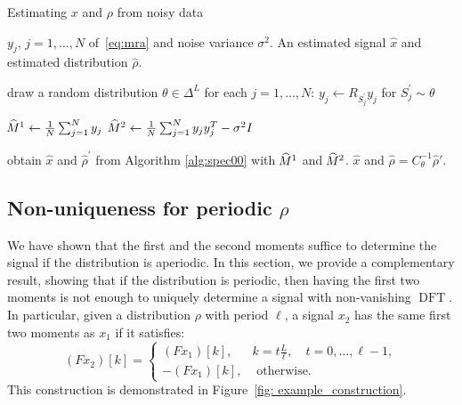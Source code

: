\documentclass{IEEEtran}
\numberwithin{equation}{section}
\numberwithin{figure}{section}
\theoremstyle{plain}
\theoremstyle{definition}
\theoremstyle{remark}
\theoremstyle{plain}
\theoremstyle{remark}
\theoremstyle{plain}
\theoremstyle{plain}
\theoremstyle{remark}
\newcommand{\F}{F}
\newcommand{\DFT}{\operatorname{DFT}}
\newcommand{\hatM}{\widehat{\hspace{-1pt}M}\phantom{\hspace{-11pt}M}}
\begin{document}
\begin{algorithm}[ht]
    \caption{Estimating $x$ and $\rho$ from noisy data}
    \label{alg:SpectralAlg}
    \begin{algorithmic}[1]
        \REQUIRE  $y_j$, $j=1,\ldots,N$ of~\eqref{eq:mra} and noise variance $\sigma^2$.
        \ENSURE An estimated signal $\hat{x}$ and estimated distribution $\hat{\rho}$.
        
         \setcounter{ALC@line}{0}  \renewcommand{\theALC@line}{1.\arabic{ALC@line}}
        \STATE draw a random distribution $\theta \in \Delta^L $
        \STATE for each $j=1,\dots,N$: $y_j \gets R_{S^\prime_j}y_j $ for $S^\prime_j \sim\theta$

        
         \setcounter{ALC@line}{0}  \renewcommand{\theALC@line}{2.\arabic{ALC@line}}
        \STATE $\hatM^1 \gets \frac{1}{N} \sum_{j=1}^N y_j$
        \STATE $\hatM^2 \gets \frac{1}{N} \sum_{j=1}^N y_j y_j^T -\sigma^2 I $ \label{line:ps1}
                
         \setcounter{ALC@line}{0}  \renewcommand{\theALC@line}{3.\arabic{ALC@line}}
        
        \STATE obtain $\hat{x}$ and $\hat{\rho}^\prime$ from Algorithm \ref{alg:spec00} with $\hatM^1$ and $\hatM^2$.
        \RETURN $\hat{x}$ and $\hat{\rho} = C_\theta^{-1}\hat{\rho}'.$
    \end{algorithmic}
\end{algorithm}

\subsection{Non-uniqueness for periodic $\rho$}
\label{sec:nonunique}

We have shown that the first and the second moments suffice to determine the signal if the distribution is aperiodic. In this section, we provide a complementary result, showing that if the distribution is periodic, then having the first two moments is not enough to uniquely determine a signal with non-vanishing $\DFT$. In particular, given a distribution $\rho$ with period $\ell$, a signal $x_2$ has the same first two moments as $x_1$ if it satisfies: 
\begin{equation} \label{eq:construction_example} 
(\F{x_2})[k] = \left\{
\begin{array}{ll}
(\F{x_1})[k],  & k=t\frac{L}{\ell}, \quad t=0,\ldots,\ell-1 , \\
-(\F{x_1})[k], & \mbox{  otherwise. }
\end{array}
\right.
\end{equation}
This construction is demonstrated in Figure~\ref{fig: example_construction}. 
\end{document}
